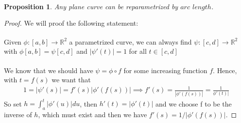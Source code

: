 \documentclass[12pt, a4paper, titlepage]{article}
\newtheorem{proposition}{Proposition}
\begin{document}
\begin{proposition}
Any plane curve can be reparametrized by $arc$ $length$.
\end{proposition}
\begin{proof}
We will proof the following statement: \\
\\
Given $\phi:[a,b] \rightarrow \mathbb{R}^2$ a parametrized curve, we can always find $\psi:[c,d] \rightarrow \mathbb{R}^2$ with $\phi[a,b]=\psi[c,d]$ and $|\psi'(t)|=1$ for all $t \in [c,d]$ 
\\\\
We know that we should have $\psi = \phi\circ f$ for some increasing function $f$. Hence, with $t=f(s)$ we want that 
\begin{align*}
1 = |\psi'(s)| = f'(s)|\phi'(f(s))| \implies f'(s)=\frac{1}{|\phi'(f(s))|} = \frac{1}{\phi'(t)|}
\end{align*}
So set $h=\int_a^t|\phi'(u)|du$, then $h'(t)=|\phi'(t)|$ and we choose f to be the inverse of $h$, which must exist and then we have $f'(s)= 1/|\phi'(f(s))|$.
\end{proof}
\end{document}

